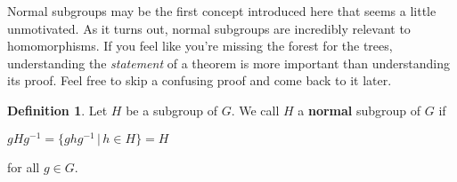 \documentclass[12pt]{article}
\newcommand{\inv}[1]{#1^{-1}}
\theoremstyle{definition}
\newtheorem{definition}{Definition}[section]
\newenvironment{defn}[1][]
{\theoremstyle{definition}
\begin{definition}{}}
{\end{definition}}
\begin{document}
Normal subgroups may be the first concept introduced here that seems a little unmotivated. As it turns out, normal subgroups are incredibly relevant to homomorphisms. If you feel like you're missing the forest for the trees, understanding the \textit{statement} of a theorem is more important than understanding its proof. Feel free to skip a confusing proof and come back to it later.

\begin{defn}
Let $H$ be a subgroup of $G$. We call $H$ a \textbf{normal} subgroup of $G$ if
\begin{center}
    $gH\inv{g} = \{gh\inv{g} \,|\, h \in H\} = H$
\end{center}
for all $g \in G$.
\end{defn}
\end{document}
